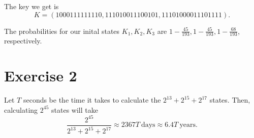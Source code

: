 \documentclass{article}
\theoremstyle{definition}
\theoremstyle{definition}
\theoremstyle{definition}
\begin{document}
The key we get is $$K = (1000111111110, 111010011100101, 11101000011101111).$$

The probabilities for our inital states $K_1, K_2, K_3$ are $1 - \frac{45}{193}, 1 - \frac{45}{193}, 1 - \frac{68}{193}$, respectively.

\section{Exercise 2}
Let $T$ seconds be the time it takes to calculate the $2^{13}+2^{15}+2^{17}$ states. Then, calculating $2^{45}$ states will take $$\frac{2^{45}}{2^{13}+2^{15}+2^{17}} \approx 2367T\ \text{days} \approx 6.4T\ \text{years}.$$

\end{document}
